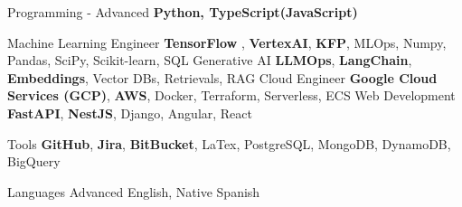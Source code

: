 \cvskill
{Programming - Advanced} %
{\textbf{Python, TypeScript(JavaScript)}} %

\cvskill
{Machine Learning Engineer}
{\textbf{TensorFlow} , \textbf{VertexAI}, \textbf{KFP}, MLOps, Numpy, Pandas, SciPy, Scikit-learn, SQL}
\cvskill
{Generative AI}
{\textbf{LLMOps}, \textbf{LangChain}, \textbf{Embeddings}, Vector DBs,  Retrievals, RAG}
\cvskill
{Cloud Engineer}
{\textbf{Google Cloud Services (GCP)}, \textbf{AWS}, Docker, Terraform, Serverless, ECS}
\cvskill
{Web Development} %
{\textbf{FastAPI}, \textbf{NestJS}, Django, Angular, React} %

\cvskill
{Tools}
{\textbf{GitHub}, \textbf{Jira}, \textbf{BitBucket}, LaTex, PostgreSQL, MongoDB, DynamoDB, BigQuery}

\cvskill
{Languages} %
{Advanced English, Native Spanish} %

